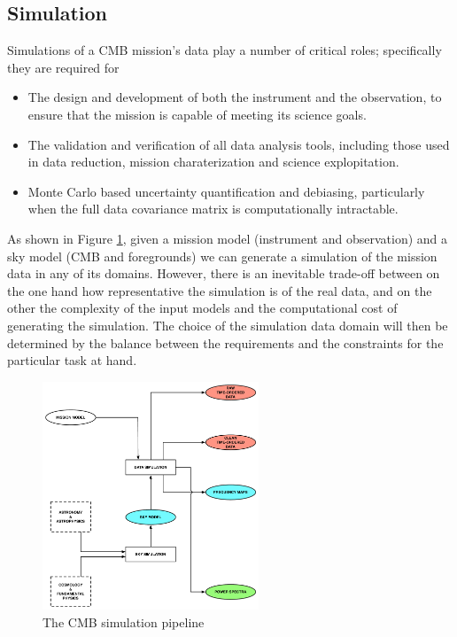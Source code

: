 \subsection{Simulation}

Simulations of a CMB mission's data play a number of critical roles; specifically they are required for
\begin{itemize}
\item The design and development of both the instrument and the observation, to ensure that the mission is capable of meeting its science goals.
\item The validation and verification of all data analysis tools, including those used in data reduction, mission charaterization and science explopitation.
\item Monte Carlo based uncertainty quantification and debiasing, particularly when the full data covariance matrix is computationally intractable.
\end{itemize}

As shown in Figure \ref{fig_sim}, given a mission model (instrument and observation) and a sky model (CMB and foregrounds) we can generate a simulation of the mission data in any of its domains. However, there is an inevitable trade-off between on the one hand how representative the simulation is of the real data, and on the other the complexity of the input models and the computational cost of generating the simulation. The choice of the simulation data domain will then be determined by the balance between the requirements and the constraints for the particular task at hand.

\begin{figure}[htbp]
\includegraphics[width=0.575\textwidth]{Analysis/sim}
\caption{The CMB simulation pipeline}
\label{fig_sim}
\end{figure}

